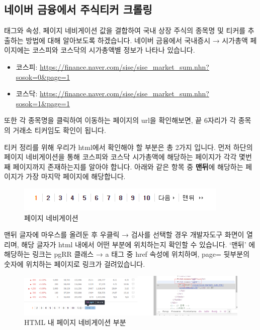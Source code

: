 \documentclass[]{book}
\providecommand{\tightlist}{%
  \setlength{\itemsep}{0pt}\setlength{\parskip}{0pt}}
\begin{document}
\hypertarget{section-16}{%
\subsection{네이버 금융에서 주식티커 크롤링}\label{section-16}}

태그와 속성, 페이지 네비게이션 값을 결합하여 국내 상장 주식의 종목명 및 티커를 추출하는 방법에 대해 알아보도록 하겠습니다. 네이버 금융에서 국내증시 → 시가총액 페이지에는 코스피와 코스닥의 시가총액별 정보가 나타나 있습니다.

\begin{itemize}
\tightlist
\item
  코스피: \url{https://finance.naver.com/sise/sise_market_sum.nhn?sosok=0\&page=1}
\item
  코스닥: \url{https://finance.naver.com/sise/sise_market_sum.nhn?sosok=1\&page=1}
\end{itemize}

또한 각 종목명을 클릭하여 이동하는 페이지의 url을 확인해보면, 끝 6자리가 각 종목의 거래소 티커임도 확인이 됩니다.

티커 정리를 위해 우리가 html에서 확인해야 할 부분은 총 2가지 입니다. 먼저 하단의 페이지 네비게이션을 통해 코스피와 코스닥 시가총액에 해당하는 페이지가 각각 몇번째 페이지까지 존재하는지를 알아야 합니다. 아래와 같은 항목 중 \textbf{맨뒤}에 해당하는 페이지가 가장 마지막 페이지에 해당합니다.

\begin{figure}

{\centering \includegraphics[width=0.7\linewidth]{images/crawl_page_navi} 

}

\caption{페이지 네비게이션}\label{fig:unnamed-chunk-16}
\end{figure}

맨뒤 글자에 마우스를 올려둔 후 우클릭 → 검사를 선택할 경우 개발자도구 화면이 열리며, 해당 글자가 html 내에서 어떤 부분에 위치하는지 확인할 수 있습니다. `맨뒤' 에 해당하는 링크는 pgRR 클래스 → a 태그 중 href 속성에 위치하며, page= 뒷부분의 숫자에 위치하는 페이지로 링크가 걸려있습니다.

\begin{figure}

{\centering \includegraphics[width=1\linewidth]{images/crawl_page_navi2} 

}

\caption{HTML 내 페이지 네비게이션 부분}\label{fig:unnamed-chunk-17}
\end{figure}
\end{document}
